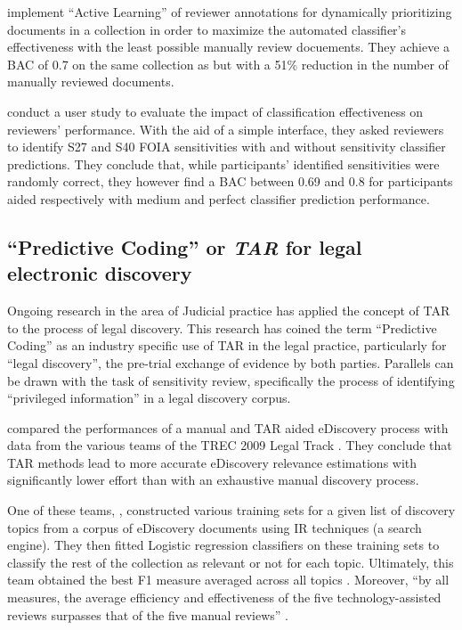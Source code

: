 \documentclass[\version]{l4proj}
\begin{document}
\textcite{mcdonaldActiveLearningStrategies2018} implement ``Active Learning'' of reviewer annotations for dynamically prioritizing documents in a collection in order to maximize the automated classifier's effectiveness with the least possible manually review docuements.
They achieve a BAC of 0.7 on the same collection as \textcite{mcdonaldStudySVMKernel2017,mcdonaldEnhancingSensitivityClassification2017} but with a 51\% reduction in the number of manually reviewed documents.

\textcite{mcdonaldHowSensitivityClassification2019} conduct a user study to evaluate the impact of classification effectiveness on reviewers' performance. With the aid of a simple interface, they asked reviewers to identify S27 and S40 FOIA sensitivities with and without sensitivity classifier predictions.
They conclude that, while participants' identified sensitivities were randomly correct, they however find a BAC between 0.69 and 0.8 for participants aided respectively with medium and perfect classifier prediction performance.

\subsection{``Predictive Coding'' or \textit{TAR} for legal electronic discovery}

Ongoing research in the area of Judicial practice has applied the concept of TAR to the process of legal discovery.
This research has coined the term ``Predictive Coding'' \autocite{carrollGrossmancormackGlossaryTechnologyassisted2013} as an industry specific use of TAR in the legal practice, particularly for ``legal discovery'', the pre-trial exchange of evidence by both parties.
Parallels can be drawn with the task of sensitivity review, specifically the process of identifying ``privileged information'' in a legal discovery corpus.

\textcite{grossmanTechnologyAssistedReviewEDiscovery2010} compared the performances of a manual and TAR aided eDiscovery process with data from the various teams of the TREC 2009 Legal Track \autocite{hedinOverviewTREC2009}.
They conclude that TAR methods lead to more accurate eDiscovery relevance estimations with significantly lower effort than with an exhaustive manual discovery process.

One of these teams, \textcite{cormackMachineLearningInformation2009}, constructed various training sets for a given list of discovery topics from a corpus of eDiscovery documents using IR techniques (a search engine).
They then fitted Logistic regression classifiers on these training sets to classify the rest of the collection as relevant or not for each topic.
Ultimately, this team obtained the best F1 measure averaged across all topics \autocite{hedinOverviewTREC2009}.
Moreover, ``by all measures, the average efficiency and effectiveness of the five technology-assisted reviews surpasses that of the five manual reviews'' \autocite[p.~43]{grossmanTechnologyAssistedReviewEDiscovery2010}.
\end{document}
